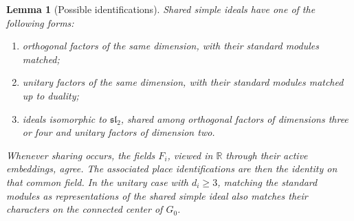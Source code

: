 \documentclass[11pt]{article}
\numberwithin{equation}{section}
\newtheorem{lemma}[theorem]{Lemma}
\theoremstyle{definition}
\theoremstyle{remark}
\begin{document}
\begin{lemma}[Possible identifications]\label{lem:mixed-shared}
Shared simple ideals have one of the following forms:
\begin{enumerate}
\item orthogonal factors of the same dimension, with their standard
  modules matched;
\item unitary factors of the same dimension, with their standard
  modules matched up to duality;
\item ideals isomorphic to $\mathfrak{sl}_2$, shared among orthogonal
  factors of dimensions three or four and unitary factors of
  dimension two.
\end{enumerate}
Whenever sharing occurs, the fields $F_i$, viewed in $\mathbb R$ through
their active embeddings, agree.  The associated place identifications
are then the identity on that common field.  In the unitary case with
$d_i\ge3$, matching the standard modules as representations of the
shared simple ideal also matches their characters on the connected
center of $G_0$.
\end{lemma}
\end{document}
